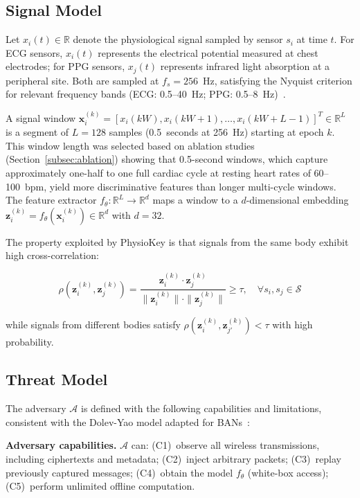 \documentclass[sensors,article,submit,pdftex,moreauthors]{Definitions/mdpi}
\begin{document}
\subsection{Signal Model}
\label{subsec:signal_model}

Let $x_i(t) \in \mathbb{R}$ denote the physiological signal sampled by sensor $s_i$ at time $t$. For ECG sensors, $x_i(t)$ represents the electrical potential measured at chest electrodes; for PPG sensors, $x_j(t)$ represents infrared light absorption at a peripheral site. Both are sampled at $f_s = 256$~Hz, satisfying the Nyquist criterion for relevant frequency bands (ECG: 0.5--40~Hz; PPG: 0.5--8~Hz)~\cite{clifford2006advanced}.

A signal window $\mathbf{x}_i^{(k)} = [x_i(kW), x_i(kW+1), \ldots, x_i(kW+L-1)]^T \in \mathbb{R}^L$ is a segment of $L = 128$ samples (0.5~seconds at 256~Hz) starting at epoch $k$. This window length was selected based on ablation studies (Section~\ref{subsec:ablation}) showing that 0.5-second windows, which capture approximately one-half to one full cardiac cycle at resting heart rates of 60--100~bpm, yield more discriminative features than longer multi-cycle windows. The feature extractor $f_\theta: \mathbb{R}^L \rightarrow \mathbb{R}^d$ maps a window to a $d$-dimensional embedding $\mathbf{z}_i^{(k)} = f_\theta(\mathbf{x}_i^{(k)}) \in \mathbb{R}^d$ with $d = 32$.

The property exploited by PhysioKey is that signals from the same body exhibit high cross-correlation:

\begin{equation}
\label{eq:correlation}
\rho(\mathbf{z}_i^{(k)}, \mathbf{z}_j^{(k)}) = \frac{\mathbf{z}_i^{(k)} \cdot \mathbf{z}_j^{(k)}}{\|\mathbf{z}_i^{(k)}\| \cdot \|\mathbf{z}_j^{(k)}\|} \geq \tau, \quad \forall s_i, s_j \in \mathcal{S}
\end{equation}

while signals from different bodies satisfy $\rho(\mathbf{z}_i^{(k)}, \mathbf{z}_{j'}^{(k)}) < \tau$ with high probability.

\subsection{Threat Model}
\label{subsec:threat_model}

The adversary $\mathcal{A}$ is defined with the following capabilities and limitations, consistent with the Dolev-Yao model adapted for BANs~\cite{dolev1983security}:

\textbf{Adversary capabilities.} $\mathcal{A}$ can: (C1)~observe all wireless transmissions, including ciphertexts and metadata; (C2)~inject arbitrary packets; (C3)~replay previously captured messages; (C4)~obtain the model $f_\theta$ (white-box access); (C5)~perform unlimited offline computation.
\end{document}
